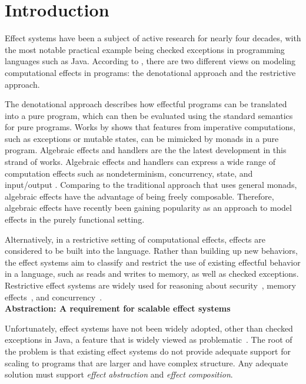
\chapter{Introduction}


Effect systems have been a subject of active research for nearly four decades, with the most notable practical example being checked exceptions in programming languages such as Java. According to \citet{filinski10}, there are two different views on modeling computational effects in programs: the denotational approach and the restrictive approach.

The denotational approach describes how effectful programs can be translated into a pure program, which can then be evaluated using the standard semantics for pure programs. Works by \citet{moggi89} shows that features from imperative computations, such as exceptions or mutable states, can be mimicked by monads in a pure program. Algebraic effects and handlers \cite{plotkin09} are the the latest development in this strand of works. Algebraic effects and handlers can express a wide range of computation effects such as nondeterminism, concurrency, state, and input/output \cite{plotkin09}. Comparing to the traditional approach that uses general monads, algebraic effects have the advantage of being freely composable. Therefore, algebraic effects have recently been gaining popularity as an approach to model effects in the purely functional setting.

Alternatively, in a restrictive setting of computational effects, effects are considered to be built into the language. Rather than building up new behaviors, the effect systems aim to classify and restrict the use of existing effectful behavior in a language, such as reads and writes to memory, as well as checked exceptions. Restrictive effect systems are widely used for reasoning about security~\cite{turbak08}, memory effects~\cite{lucassen88}, and concurrency~\cite{bocchino09,bracevac18,dolan17}. \\

\noindent\textbf{Abstraction: A requirement for scalable effect systems}

 Unfortunately, effect systems have not been widely adopted, other than checked exceptions in Java, a feature that is widely viewed as problematic~\cite{10.1145/1103845.1094847}.  The root of the problem is that existing effect systems do not provide adequate support for scaling to programs that are larger and have complex structure.  Any adequate solution must support \textit{effect abstraction} and \textit{effect composition}.

